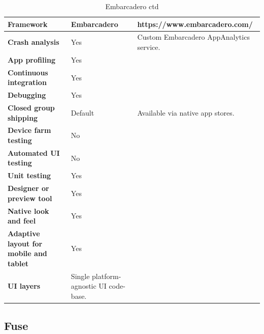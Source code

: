 \documentclass[english,master,public,dept460,male,cpdeclaration,oneside]{diploma}
\begin{document}
\begin{table}[!h]
	\centering
	\caption{Embarcadero ctd}
	\begin{tabular}{p{} | p{} | p{}}
		\toprule		
		\textbf{Framework} & \textbf{Embarcadero} & https://www.embarcadero.com/ \\
		\midrule
		\textbf{Crash analysis} & Yes & Custom Embarcadero AppAnalytics service. \\			
		\midrule
		\textbf{App profiling} & Yes & \\			
		\midrule
		\textbf{Continuous integration} & Yes & \\			
		\midrule
		\textbf{Debugging} & Yes & \\			
		\midrule
		\textbf{Closed group shipping} & Default & Available via native app stores. \\			
		\midrule
		\textbf{Device farm testing} & No & \\			
		\midrule
		\textbf{Automated UI testing} & No & \\			
		\midrule
		\textbf{Unit testing} & Yes & \\			
		\midrule
		\textbf{Designer or preview tool} & Yes & \\			
		\midrule
		\textbf{Native look and feel} & Yes & \\			
		\midrule
		\textbf{Adaptive layout for mobile and tablet} & Yes & \\			
		\midrule		
		\textbf{UI layers} & Single platform-agnostic UI code-base. &  \\			
		\midrule
	\end{tabular}
\end{table}

\clearpage
\subsection{Fuse}
\end{document}
